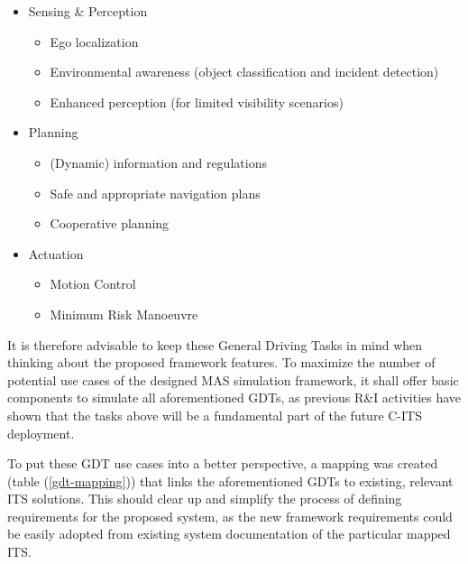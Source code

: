 \documentclass[main.tex]{subfiles}
\begin{document}
\begin{itemize}
    \item Sensing \& Perception
    \begin{itemize}
        \item Ego localization
        \item Environmental awareness (object classification and incident detection)
        \item Enhanced perception (for limited visibility scenarios)
    \end{itemize}
    \item Planning
    \begin{itemize}
        \item (Dynamic) information and regulations
        \item Safe and appropriate navigation plans
        \item Cooperative planning
    \end{itemize}
    \item Actuation
    \begin{itemize}
        \item Motion Control
        \item Minimum Risk Manoeuvre
    \end{itemize}
\end{itemize}

It is therefore advisable to keep these General Driving Tasks in mind when thinking about the proposed framework 
features. To maximize the number of potential use cases of the designed MAS simulation framework, 
it shall offer basic components to simulate all aforementioned GDTs, as previous R\&I
activities have shown that the tasks above will be a fundamental part of the future C-ITS deployment.

To put these GDT use cases into a better perspective, a mapping was created (table
(\ref{gdt-mapping})) that links the aforementioned GDTs to existing, relevant ITS solutions.
This should clear up and simplify the process of defining requirements for the proposed system,
as the new framework requirements could be easily adopted from existing system documentation of
the particular mapped ITS.
\end{document}
